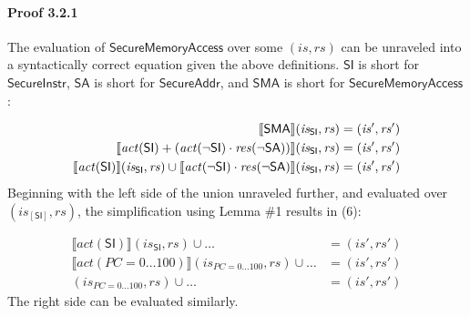\documentclass[12pt, letterpaper]{article}
\newcommand\interp[1]{\llbracket #1 \rrbracket}
\begin{document}
 \paragraph{Proof 3.2.1}
     The evaluation of $\mathsf{SecureMemoryAccess}$ over some $(\mathit{is},\mathit{rs})$ can be unraveled into a syntactically correct equation given the above definitions.  $\mathsf{SI}$ is short for $\mathsf{SecureInstr}$, $\mathsf{SA}$ is short for $\mathsf{SecureAddr}$, and $\mathsf{SMA}$ is short for $\mathsf{SecureMemoryAccess}$:
 \par\nobreak
 {\fontsize{10pt}{12pt}\selectfont
 \begin{align}
     \setcounter{equation}{0}
     \interp{ \mathsf{SMA} } (\mathit{is_{\mathsf{SI}}}, \mathit{rs})
     &=
     (\mathit{is}', \mathit{rs}')
     \\
     \interp{ \mathit{act}(\mathsf{SI}) +
     (\mathit{act}(\neg\mathsf{SI}) \cdot
      \mathit{res}(\neg\mathsf{SA})) } (\mathit{is_{\mathsf{SI}}}, \mathit{rs})
     &=
     (\mathit{is}', \mathit{rs}')
     \\
     \interp{ \mathit{act}(\mathsf{SI}) } (\mathit{is_{\mathsf{SI}}}, \mathit{rs}) \cup %
     \interp{ \mathit{act}(\neg\mathsf{SI}) \cdot
      \mathit{res}(\neg\mathsf{SA}) } (\mathit{is_{\mathsf{SI}}}, \mathit{rs})
     &=
     (\mathit{is}', \mathit{rs}')
 \end{align}
 }%
     Beginning with the left side of the union unraveled further, and evaluated over $(\mathit{is}_{[\mathsf{SI}]},\mathit{rs})$, the simplification using Lemma \#1 results in (6):
 \par\nobreak
 {\fontsize{10pt}{12pt}\selectfont
 \begin{align}
     \interp{ \mathit{act} (\mathsf{SI}) } (\mathit{is_{\mathsf{SI}}}, \mathit{rs}) \cup \ldots
     &=
     (\mathit{is}', \mathit{rs}')
     \\
     \interp{ \mathit{act} (PC=0\ldots 100) } (\mathit{is_{PC=0\ldots100}}, \mathit{rs}) \cup \ldots %
     &=
     (\mathit{is}', \mathit{rs}')
     \\
     (\mathit{is_{PC=0\ldots100}}, \mathit{rs}) \cup \ldots 
     &=
     (\mathit{is}', \mathit{rs}')
 \end{align}
 }%
     The right side can be evaluated similarly.
 \par\nobreak
\end{document}
